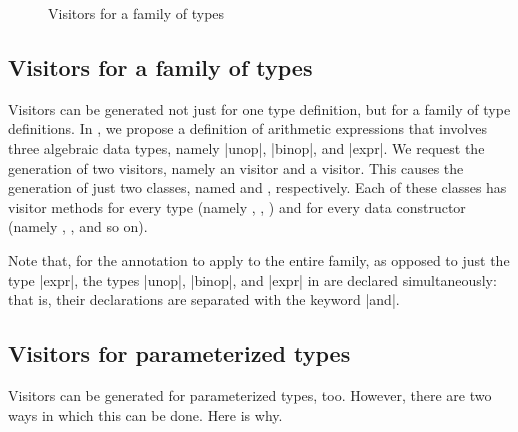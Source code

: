 \documentclass[11pt,a4paper,twoside]{article}
\begin{document}


\begin{figure}[t]
\caption{Visitors for a family of types}
\label{fig:expr06}
\end{figure}

\subsection{Visitors for a family of types}
\label{sec:intro:family}

Visitors can be generated not just for one type definition, but for a family
of type definitions. In , we propose a definition of
arithmetic expressions that involves three algebraic data types, namely
\oc|unop|, \oc|binop|, and \oc|expr|. We request the generation of two
visitors, namely an \iter visitor and a \map visitor. This causes the
generation of just two classes, named \iter and \map, respectively. Each of
these classes has visitor methods for every type (namely ,
, ) and for every data constructor
(namely , , and so on).

Note that, for the \derivingvisitors annotation to apply to the entire family,
as opposed to just the type \oc|expr|, the types \oc|unop|, \oc|binop|, and
\oc|expr| in  are declared simultaneously: that is, their
declarations are separated with the keyword \oc|and|.


\subsection{Visitors for parameterized types}
\label{sec:intro:parameterized}


Visitors can be generated for parameterized types, too. However, there are two
ways in which this can be done. Here is why.
\end{document}
